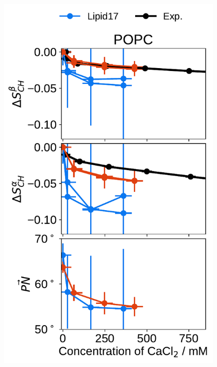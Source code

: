 \documentclass[12pt,a4paper,twoside,openright]{report}
\begin{document}
\begin{figure}[tbp!] 
  \centering 
  \includegraphics[width=\figwidthsmall]{../img/ecc_pops/order_parameters_changes_ecc-lip_L14_A-B-PN-COO_POPC_cacl.pdf} 

\end{figure}
\end{document}
